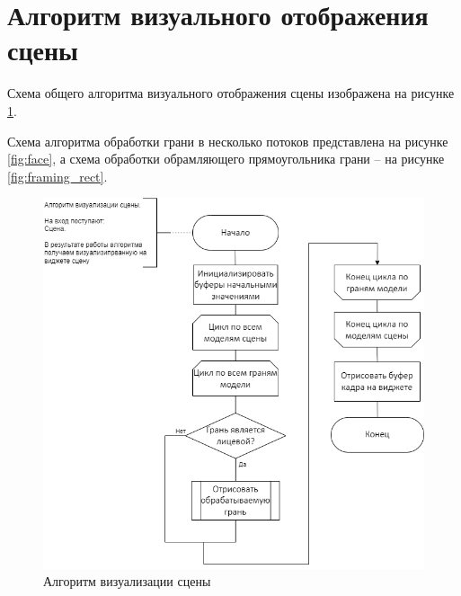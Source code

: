\section{Алгоритм визуального отображения сцены}

Схема общего алгоритма визуального отображения сцены изображена на рисунке \ref{fig:rendering}. 

Схема алгоритма обработки грани в несколько потоков представлена на рисунке \ref{fig:face}, а схема обработки обрамляющего прямоугольника грани -- на рисунке \ref{fig:framing_rect}.

\begin{figure}[h]
	\centering
	\includegraphics[scale=0.67]{inc/img/rendering.png}
	\caption{Алгоритм визуализации сцены}
	\label{fig:rendering}
\end{figure} 

